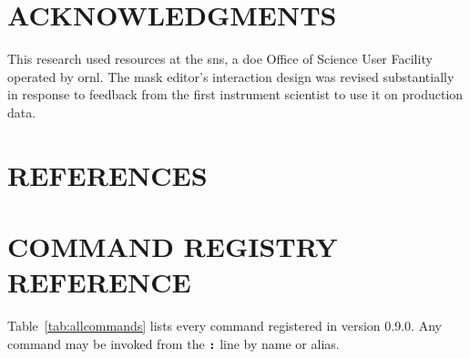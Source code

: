 \documentclass[tm]{ornltm}
\newcommand{\key}[1]{\textbf{\texttt{#1}}}
\begin{document}
\section*{ACKNOWLEDGMENTS}

This research used resources at the \ac{sns}, a \ac{doe} Office of Science User
Facility operated by \ac{ornl}. The mask editor's interaction design was revised
substantially in response to feedback from the first instrument scientist to use
it on production data.

\section{REFERENCES}
\printbibliography[heading=none]

\appendix
\acresetall

\section{COMMAND REGISTRY REFERENCE}
\label{sec:appcommands}

Table~\ref{tab:allcommands} lists every command registered in version 0.9.0.
Any command may be invoked from the \key{:} line by name or alias.
\end{document}
